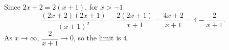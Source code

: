 Since $2x+2=2(x+1)$, for $x>-1$
\[\dfrac{(2x+2)(2x+1)}{(x+1)^2}=\dfrac{2(2x+1)}{x+1}=\dfrac{4x+2}{x+1}=4-\dfrac{2}{x+1}.\]
As $x\to\infty$, $\dfrac{2}{x+1}\to0$, so the limit is $\boxed{4}$.
